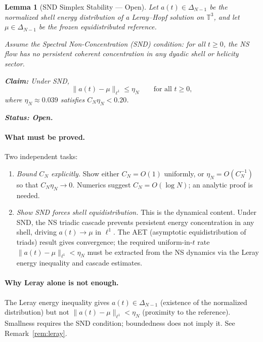 \documentclass[12pt]{amsart}
\newtheorem{lemma}[theorem]{Lemma}
\theoremstyle{definition}
\begin{document}
\begin{tcolorbox}[openbox]
\begin{lemma}[SND Simplex Stability — Open]
\label{lem:snd-simplex}
Let $a(t)\in\Delta_{N-1}$ be the normalized shell energy distribution
of a Leray--Hopf solution on $\mathbb T^3$, and let $\mu\in\Delta_{N-1}$
be the frozen equidistributed reference.

Assume the Spectral Non-Concentration (SND) condition:
for all $t\ge0$, the NS flow has no persistent coherent concentration
in any dyadic shell or helicity sector.

\textbf{Claim:} Under SND,
\[
\|a(t)-\mu\|_{\ell^1} \le \eta_N \qquad\text{for all }t\ge0,
\]
where $\eta_N\approx 0.039$ satisfies $C_N\eta_N<0.20$.

\textbf{Status: Open.}
\end{lemma}
\end{tcolorbox}

\paragraph{What must be proved.}
Two independent tasks:
\begin{enumerate}
\item[\textbf{(T1)}] \textit{Bound $C_N$ explicitly.}
  Show either $C_N=O(1)$ uniformly, or $\eta_N=O(C_N^{-1})$
  so that $C_N\eta_N\to0$.
  Numerics suggest $C_N=O(\log N)$; an analytic proof is needed.

\item[\textbf{(T2)}] \textit{Show SND forces shell equidistribution.}
  This is the dynamical content.
  Under SND, the NS triadic cascade prevents persistent energy
  concentration in any shell, driving $a(t)\to\mu$ in $\ell^1$.
  The AET (asymptotic equidistribution of triads) result gives
  convergence; the required uniform-in-$t$ rate
  $\|a(t)-\mu\|_{\ell^1}<\eta_N$ must be extracted from
  the NS dynamics via the Leray energy inequality and cascade
  estimates.
\end{enumerate}

\paragraph{Why Leray alone is not enough.}
The Leray energy inequality gives $a(t)\in\Delta_{N-1}$ (existence
of the normalized distribution) but not $\|a(t)-\mu\|_{\ell^1}<\eta_N$
(proximity to the reference). Smallness requires the SND condition;
boundedness does not imply it. See Remark~\ref{rem:leray}.
\end{document}
